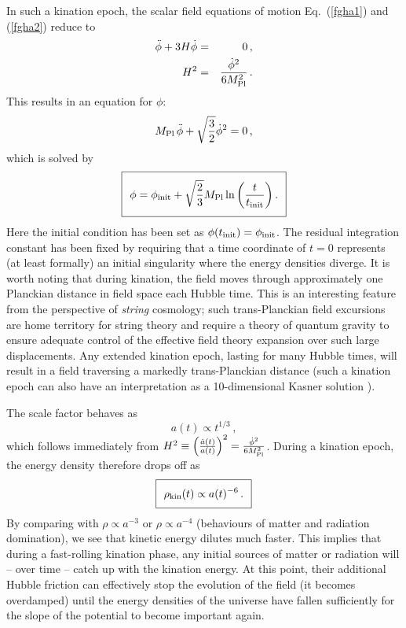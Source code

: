 In such a kination epoch, the scalar field equations of motion Eq.~(\ref{fgha1}) and (\ref{fgha2})
reduce to 
\begin{eqnarray}
\ddot{\phi} + 3H\dot{\phi} & =  & 0\,, \\
H^2 & = &  \frac{\dot{\phi}^2}{6 M_{\rm Pl}^2}\,.
\label{HEq}
\end{eqnarray}
This results in an equation for $\phi$:
\begin{equation}
M_{\rm Pl} \, \ddot{\phi} + \sqrt{\frac32}  \dot{\phi}^2 = 0\,,
\end{equation}
which is solved by 
\begin{equation}
\label{fieldkination}
\setlength\fboxsep{0.25cm}
\setlength\fboxrule{0.4pt}
\boxed{
\phi = \phi_{\rm init} + \sqrt{\frac23} M_{\rm Pl} \ln \left( \frac{t}{t_{\rm init}} \right).
}
\end{equation}
Here the initial condition has been set as $\phi(t_{\rm init}) = \phi_{\rm init}$. The residual integration constant has been fixed by requiring that a time coordinate of $t=0$ represents (at least formally) an initial singularity where the energy densities diverge. It is worth noting that during kination, the field moves through approximately one Planckian distance in field space each Hubble time. 
This is an interesting feature from the perspective of \emph{string} cosmology; such trans-Planckian field excursions are home territory for string theory and require a theory of quantum gravity to ensure adequate control of the effective field theory expansion over such large displacements. Any extended kination epoch, lasting for many Hubble times, will result in a field traversing a markedly trans-Planckian distance (such a kination epoch can also have an interpretation as a 10-dimensional Kasner solution \cite{Apers:2022cyl}).

The scale factor behaves as
\begin{equation}
a(t) \propto t^{1/3}\,,
\end{equation}
which follows immediately from $H^2 \equiv \left(\frac{\dot{a}(t)}{a(t)}\right)^2 = \frac{\dot{\phi}^2}{6 M_{\rm Pl}^2}$. During a kination epoch, the energy density  therefore drops off as
\begin{equation}
\setlength\fboxsep{0.25cm}
\setlength\fboxrule{0.4pt}
\boxed{
\rho_{\rm kin}(t) \propto a(t)^{-6}\,.
}
\end{equation}
By comparing with $\rho \propto a^{-3}$ or $\rho \propto a^{-4}$ (behaviours of matter and radiation domination), we see that kinetic energy dilutes much faster. This implies that during a fast-rolling kination phase, any initial sources of matter or radiation will -- over time -- catch up with the kination energy. At this point, their additional Hubble friction can effectively stop the evolution of the field (it becomes overdamped) until the energy densities of the universe have fallen sufficiently for the slope of the potential to become important again.

